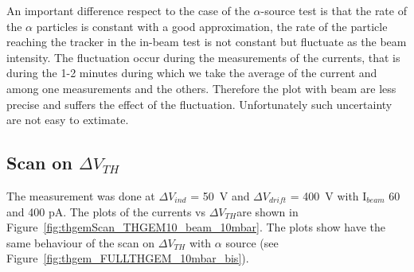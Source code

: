 \documentclass[a4paper, 11 pt]{report}
\newcommand{\Vind}{$\Delta V_{ind}$}
\newcommand{\Vthgem}{$\Delta V_{TH}$}
\newcommand{\Vdrift}{$ \Delta V_{drift}$}
\begin{document}
An important difference respect to the case of the $\alpha$-source test is that the rate
of the $\alpha$ particles is constant with a good approximation, the rate of the
particle reaching the tracker in the in-beam test is not constant but fluctuate
as the beam intensity.
The fluctuation occur during the measurements of the currents, that is during the 1-2 minutes
during which we take the average of the current and among one measurements and the others.
Therefore the plot with beam are less precise and suffers the effect of the fluctuation.
Unfortunately such uncertainty are not easy to extimate.


\subsection{Scan on \Vthgem}
The measurement was done at \Vind{} = 50~V and \Vdrift{} = 400~V with I$_{beam}$ 60 and 400 pA. 
The plots of the currents vs \Vthgem are shown in Figure~\ref{fig:thgemScan_THGEM10_beam_10mbar}.
The plots show have the same behaviour of the scan on \Vthgem{} with $\alpha$ source (see Figure~\ref{fig:thgem_FULLTHGEM_10mbar_bis}). 
\end{document}
